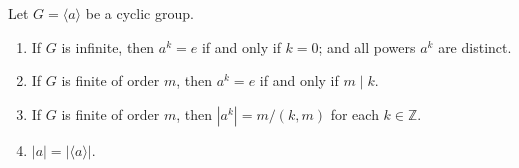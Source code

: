 \begin{theorem}
Let $G = \langle a \rangle$ be a cyclic group.
\begin{enumerate}
    \item[(i)] If $G$ is infinite, then $a^k = e$ if and only if $k = 0$; and all powers $a^k$ are distinct.
    \item[(ii)] If $G$ is finite of order $m$, then $a^k = e$ if and only if $m \mid k$.
    \item[(iii)] If $G$ is finite of order $m$, then $|a^k| = m/(k,m)$ for each $k \in \mathbb{Z}$.
    \item[(iv)] $|a| = |\langle a \rangle|$.
\end{enumerate}
\end{theorem}
